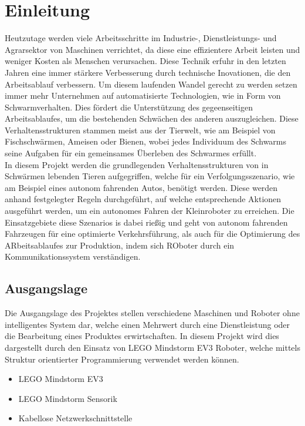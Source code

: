 \setcounter{page}{1}
\ofoot{\pagemark}

\section{Einleitung}

Heutzutage werden viele Arbeitsschritte im Industrie-, Dienstleistungs- und Agrarsektor von Maschinen verrichtet, da diese eine effizientere Arbeit leisten und weniger Kosten als Menschen verursachen. Diese Technik erfuhr in den letzten Jahren eine immer stärkere Verbesserung durch technische Inovationen, die den Arbeitsablauf verbessern. Um diesem laufenden Wandel gerecht zu werden setzen immer mehr Unternehmen auf automatisierte Technologien, wie in Form von Schwarmverhalten. Dies fördert die Unterstützung des gegeenseitigen Arbeitsablaufes, um die bestehenden Schwächen des anderen auszugleichen. Diese Verhaltensstrukturen stammen meist aus der Tierwelt, wie am Beispiel von Fischschwärmen, Ameisen oder Bienen, wobei jedes Individuum des Schwarms seine Aufgaben für ein gemeinsames Überleben des Schwarmes erfüllt.\\
In diesem Projekt werden die grundlegenden Verhaltensstrukturen von in Schwärmen lebenden Tieren aufgegriffen, welche für ein Verfolgungsszenario, wie am Beispiel eines autonom fahrenden Autos, benötigt werden. Diese werden anhand festgelegter Regeln durchgeführt, auf welche entsprechende Aktionen ausgeführt werden, um ein autonomes Fahren der Kleinroboter zu erreichen. Die Einsatzgebiete diese Szenarios is dabei rießig und geht von autonom fahrenden Fahrzeugen für eine optimierte Verkehrsführung, als auch für die Optimierung des ARbeitsablaufes zur Produktion, indem sich ROboter durch ein Kommunikationssystem verständigen.

\newpage
\subsection{Ausgangslage}

Die Ausgangslage des Projektes stellen verschiedene Maschinen und Roboter ohne intelligentes System dar, welche einen Mehrwert durch eine Dienstleistung oder die Bearbeitung eines Produktes erwirtschaften. In diesem Projekt wird dies dargestellt durch den Einsatz von LEGO Mindstorm EV3 Roboter, welche mittels Struktur orientierter Programmierung verwendet werden können.

\begin{itemize}
	\item LEGO Mindstorm EV3
	\item LEGO Mindstorm Sensorik
	\item Kabellose Netzwerkschnittstelle
\end{itemize}


